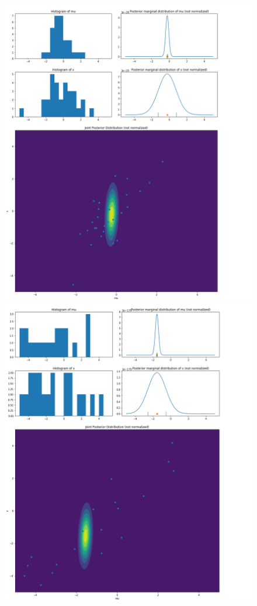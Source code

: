 \documentclass{article}
\begin{document}
\begin{figure}
	\begin{minipage}{0.5\linewidth}
	\includegraphics[width=\textwidth]{images/ground_truth_posterior_3_cut.png}
	\end{minipage}
	\begin{minipage}{0.5\linewidth}
	\includegraphics[width=\textwidth]{images/ground_truth_posterior_4_cut.png}

\end{minipage}
\end{figure}
\end{document}
